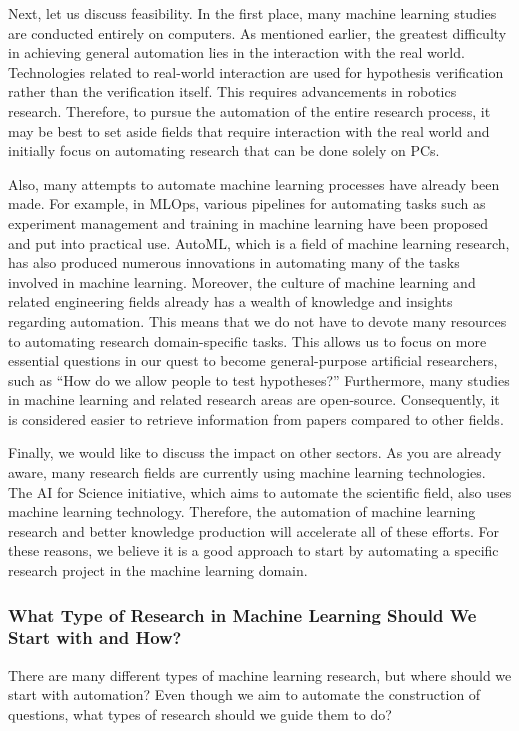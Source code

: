 Next, let us discuss feasibility. In the first place, many machine learning studies are conducted entirely on computers. As mentioned earlier, the greatest difficulty in achieving general automation lies in the interaction with the real world. Technologies related to real-world interaction are used for hypothesis verification rather than the verification itself. This requires advancements in robotics research. Therefore, to pursue the automation of the entire research process, it may be best to set aside fields that require interaction with the real world and initially focus on automating research that can be done solely on PCs. 

Also, many attempts to automate machine learning processes have already been made. For example, in MLOps, various pipelines for automating tasks such as experiment management and training in machine learning have been proposed and put into practical use. AutoML, which is a field of machine learning research, has also produced numerous innovations in automating many of the tasks involved in machine learning. Moreover, the culture of machine learning and related engineering fields already has a wealth of knowledge and insights regarding automation. This means that we do not have to devote many resources to automating research domain-specific tasks. This allows us to focus on more essential questions in our quest to become general-purpose artificial researchers, such as ``How do we allow people to test hypotheses?'' Furthermore, many studies in machine learning and related research areas are open-source. Consequently, it is considered easier to retrieve information from papers compared to other fields. 

Finally, we would like to discuss the impact on other sectors. As you are already aware, many research fields are currently using machine learning technologies. The AI for Science initiative, which aims to automate the scientific field, also uses machine learning technology. Therefore, the automation of machine learning research and better knowledge production will accelerate all of these efforts. For these reasons, we believe it is a good approach to start by automating a specific research project in the machine learning domain.

\subsubsection{What Type of Research in Machine Learning Should We Start with and How?}
There are many different types of machine learning research, but where should we start with automation? Even though we aim to automate the construction of questions, what types of research should we guide them to do?

